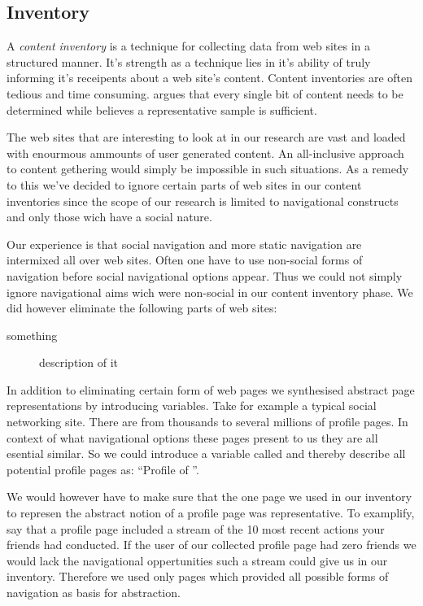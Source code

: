 \subsection{Inventory}

A \emph{content inventory} is a technique for collecting data from web sites
in a structured manner. It's strength as a technique lies in it's ability of
truly informing it's receipents about a web site's content. Content
inventories are often tedious and time consuming. \citet[p.~267]{wodtke02}
argues that every single bit of content needs to be determined while
\citet[p.~241]{morville06} believes a representative sample is sufficient.

The web sites that are interesting to look at in our research are vast and
loaded with enourmous ammounts of user generated content. An all-inclusive
approach to content gethering would simply be impossible in such situations.
As a remedy to this we've decided to ignore certain parts of web sites in our
content inventories since the scope of our research is limited to navigational
constructs and only those wich have a social nature.

Our experience is that social navigation and more static navigation are
intermixed all over web sites. Often one have to use non-social forms of
navigation before social navigational options appear. Thus we could not simply
ignore navigational aims wich were non-social in our content inventory phase.
We did however eliminate the following parts of web sites:

\begin{description}
  \item[something] description of it
\end{description}

In addition to eliminating certain form of web pages we synthesised abstract
page representations by introducing variables. Take for example a typical
social networking site. There are from thousands to several millions of
profile pages. In context of what navigational options these pages present to
us they are all esential similar. So we could introduce a variable called
%
and thereby describe all potential profile pages as: ``Profile
of ''.

We would however have to make sure that the one page we used in our inventory
to represen the abstract notion of a profile page was representative. To
examplify, say that a profile page included a stream of the 10 most recent
actions your friends had conducted. If the user of our collected profile page
had zero friends we would lack the navigational oppertunities such a stream
could give us in our inventory. Therefore we used only pages which provided
all possible forms of navigation as basis for abstraction.


